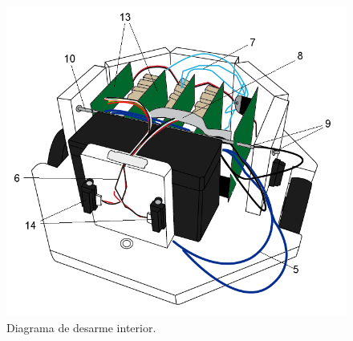 \begin{figure}
	\centering
	\includegraphics[scale=.45]{figuras/desarme_i.png}
	\caption{Diagrama de desarme interior.}
	\label{hF_desarme_3}
\end{figure}

